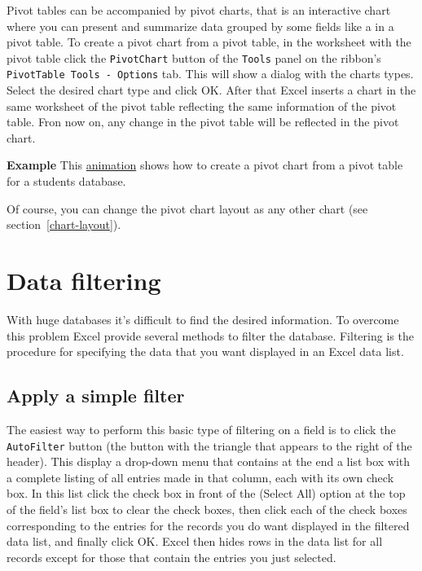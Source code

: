 Pivot tables can be accompanied by pivot charts, that is an interactive chart where you can present and summarize data grouped by some fields like a in a pivot table. To create a pivot chart from a pivot table, in the worksheet with the pivot table click the \texttt{PivotChart} button of the \texttt{Tools} panel on the ribbon's \texttt{PivotTable Tools - Options} tab. This will show a dialog with the charts types. Select the desired chart type and click OK. After that Excel inserts a chart in the same worksheet of the pivot table reflecting the same information of the pivot table. Fron now on, any change in the pivot table will be reflected in the pivot chart.

\textbf{Example} This \href{http://aprendeconalf.es/office/excel/manual/img/example_pivot_chart.gif}{animation} shows how to create a pivot chart from a pivot table for a students database.

Of course, you can change the pivot chart layout as any other chart (see section~\ref{chart-layout}).

\section{Data filtering}\hypertarget{data-filtering}{}\label{data-filtering}

With huge databases it's difficult to find the desired information. To overcome this problem Excel provide several methods to filter the database. Filtering is the procedure for specifying the data that you want displayed in an Excel data list.

\subsection{Apply a simple filter}\hypertarget{apply-a-simple-filter}{}\label{apply-a-simple-filter}

The easiest way to perform this basic type of filtering on a field is to click the \texttt{AutoFilter} button (the button with the triangle that appears to the right of the header). This display a drop-down menu that contains at the end a list box with a complete listing of all entries
made in that column, each with its own check box. In this list click the check box in front of the (Select All) option at the top of the field’s
list box to clear the check boxes, then click each of the check boxes corresponding to the entries for the records you do want displayed in the filtered data list, and finally click OK. Excel then hides rows in the data list for all records except for those that contain the entries you just selected.

